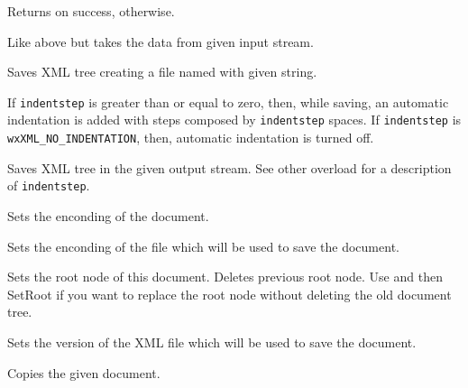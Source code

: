 Returns \true on success, \false otherwise.


Like above but takes the data from given input stream.

\label{wxxmldocumentsave}


Saves XML tree creating a file named with given string.

If {\tt indentstep} is greater than or equal to zero, then, while saving, an automatic indentation
is added with steps composed by {\tt indentstep} spaces.
If {\tt indentstep} is {\tt wxXML_NO_INDENTATION}, then, automatic indentation is turned off.


Saves XML tree in the given output stream. See other overload for a description of {\tt indentstep}.

\label{wxxmldocumentsetencoding}


Sets the enconding of the document.

\label{wxxmldocumentsetfileencoding}


Sets the enconding of the file which will be used to save the document.

\label{wxxmldocumentsetroot}


Sets the root node of this document. Deletes previous root node.
Use  and then SetRoot if you want to
replace the root node without deleting the old document tree.

\label{wxxmldocumentsetversion}


Sets the version of the XML file which will be used to save the document.

\label{wxxmldocumentoperatorassign}


Copies the given document.

